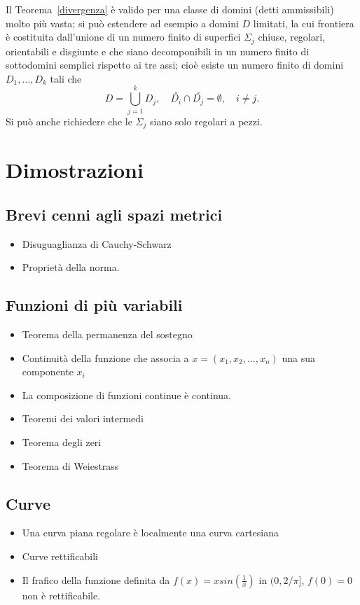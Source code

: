 \documentclass[a4paper]{book}
\numberwithin{equation}{section}
\theoremstyle{plain}
\theoremstyle{definition}
\theoremstyle{remark}
\theoremstyle{example}
\begin{document}
	Il Teorema~\ref{divergenza} è valido per una classe di domini (detti ammissibili) molto più vasta; si può estendere ad esempio a domini $D$ limitati, la cui frontiera è costituita dall'unione di un numero finito di superfici $\Sigma_j$ chiuse, regolari, orientabili e disgiunte e che siano decomponibili in un numero finito di sottodomini semplici rispetto ai tre assi; cioè esiste un numero finito di domini $D_1, \dots, D_k$ tali che
	\begin{equation*}
		D=\bigcup_{j=1}^k D_j, \quad \overset{\circ}{D_i}\cap\overset{\circ}{D_j} = \emptyset, \quad i \ne j.
	\end{equation*}
	Si può anche richiedere che le $\Sigma_j$ siano solo regolari a pezzi.

	\appendix \chapter{Dimostrazioni}
	\section{Brevi cenni agli spazi metrici}
	\begin{itemize}
		\item Disuguaglianza di Cauchy-Schwarz
		\item Proprietà della norma.
	\end{itemize}
	\section{Funzioni di più variabili}
	\begin{itemize}
		\item Teorema della permanenza del sostegno
		\item Continuità della funzione che associa a $x=(x_1,x_2,...,x_n)$ una sua componente $x_i$
		\item La composizione di funzioni continue è continua.
		\item Teoremi dei valori intermedi
		\item Teorema degli zeri
		\item Teorema di Weiestrass
	\end{itemize}
	\section{Curve}
	\begin{itemize}
		\item Una curva piana regolare è localmente una curva cartesiana
		\item Curve rettificabili
		\item Il frafico della funzione definita da $f(x) = xsin(\frac{1}{x})$ in $(0,2/\pi]$, $f(0) = 0$ non è rettificabile.
	\end{itemize}


	
\end{document}

